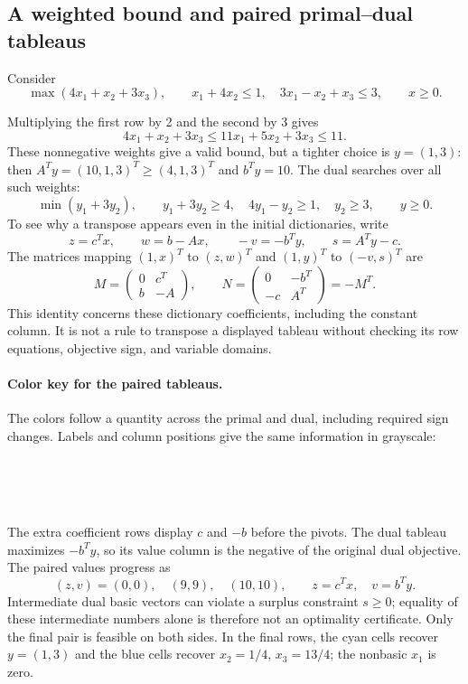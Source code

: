 \documentclass[11pt,a4paper]{article}
\begin{document}
\subsection{A weighted bound and paired primal--dual tableaus}\label{sec:paired-tableaus}
\begin{lecturecore}
  Consider
  \[
    \max(4x_1+x_2+3x_3),\qquad
    x_1+4x_2\leq1,\quad 3x_1-x_2+x_3\leq3,\qquad x\geq0.
  \]
\end{lecturecore}
Multiplying the first row by 2 and the second by 3 gives
\[
  4x_1+x_2+3x_3\leq11x_1+5x_2+3x_3\leq11.
\]
These nonnegative weights give a valid bound, but a tighter choice is
$y=(1,3)$: then $A^Ty=(10,1,3)^T\geq(4,1,3)^T$ and $b^Ty=10$.
The dual searches over all such weights:
\[
  \min(y_1+3y_2),\qquad y_1+3y_2\geq4,\quad
  4y_1-y_2\geq1,\quad y_2\geq3,\qquad y\geq0.
\]
To see why a transpose appears even in the initial dictionaries, write
\[
  z=c^Tx,\qquad w=b-Ax,\qquad
  -v=-b^Ty,\qquad s=A^Ty-c.
\]
The matrices mapping $(1,x)^T$ to $(z,w)^T$ and $(1,y)^T$ to $(-v,s)^T$ are
\[
  M=\begin{pmatrix}0&c^T\\b&-A\end{pmatrix},\qquad
  N=\begin{pmatrix}0&-b^T\\-c&A^T\end{pmatrix}=-M^T.
\]
This identity concerns these dictionary coefficients, including the constant
column. It is not a rule to transpose a displayed tableau without checking
its row equations, objective sign, and variable domains.

\paragraph{Color key for the paired tableaus.}
The colors follow a quantity across the primal and dual, including required
sign changes. Labels and column positions give the same information in grayscale:
\begin{center}\small
  \quad
  \\[3pt]
  \\[3pt]
  \\[3pt]
  \quad
\end{center}
The extra coefficient rows display $c$ and $-b$ before the pivots.
The dual tableau maximizes $-b^Ty$, so its value column is the negative of
the original dual objective. The paired values progress as
\[
  (z,v)=(0,0),\quad(9,9),\quad(10,10),\qquad
  z=c^Tx,\quad v=b^Ty.
\]
Intermediate dual basic vectors can violate a surplus constraint $s\geq0$; equality of these
intermediate numbers alone is therefore not an optimality certificate.
Only the final pair is feasible on both sides. In the final rows, the cyan
cells recover $y=(1,3)$ and the blue cells recover $x_2=1/4$, $x_3=13/4$;
the nonbasic $x_1$ is zero.
\end{document}
